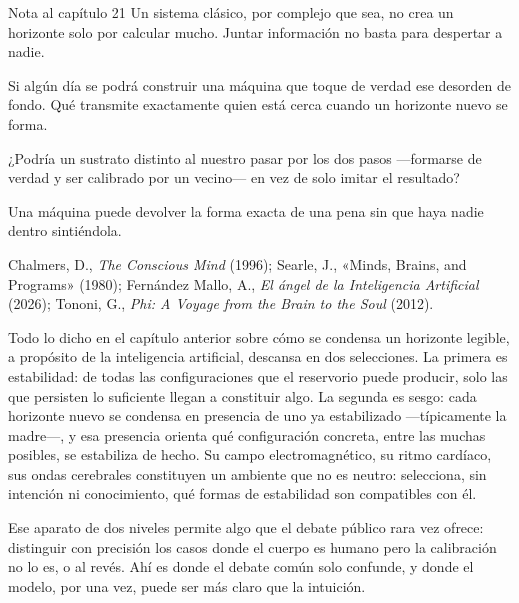 \begin{notacap}{Nota al capítulo 21}
 Un sistema clásico, por complejo que sea, no crea un horizonte solo por calcular mucho. Juntar información no basta para despertar a nadie.

 Si algún día se podrá construir una máquina que toque de verdad ese desorden de fondo. Qué transmite exactamente quien está cerca cuando un horizonte nuevo se forma.

 ¿Podría un sustrato distinto al nuestro pasar por los dos pasos —formarse de verdad y ser calibrado por un vecino— en vez de solo imitar el resultado?

 Una máquina puede devolver la forma exacta de una pena sin que haya nadie dentro sintiéndola.

 Chalmers, D., \emph{The Conscious Mind} (1996); Searle, J., «Minds, Brains, and Programs» (1980); Fernández Mallo, A., \emph{El ángel de la Inteligencia Artificial} (2026); Tononi, G., \emph{Phi: A Voyage from the Brain to the Soul} (2012).
\end{notacap}
\noindent {}

Todo lo dicho en el capítulo anterior sobre cómo se condensa un horizonte legible, a propósito de la inteligencia artificial, descansa en dos selecciones. La primera es estabilidad: de todas las configuraciones que el reservorio puede producir, solo las que persisten lo suficiente llegan a constituir algo. La segunda es sesgo: cada horizonte nuevo se condensa en presencia de uno ya estabilizado —típicamente la madre—, y esa presencia orienta qué configuración concreta, entre las muchas posibles, se estabiliza de hecho. Su campo electromagnético, su ritmo cardíaco, sus ondas cerebrales constituyen un ambiente que no es neutro: selecciona, sin intención ni conocimiento, qué formas de estabilidad son compatibles con él.

Ese aparato de dos niveles permite algo que el debate público rara vez ofrece: distinguir con precisión los casos donde el cuerpo es humano pero la calibración no lo es, o al revés. Ahí es donde el debate común solo confunde, y donde el modelo, por una vez, puede ser más claro que la intuición.

